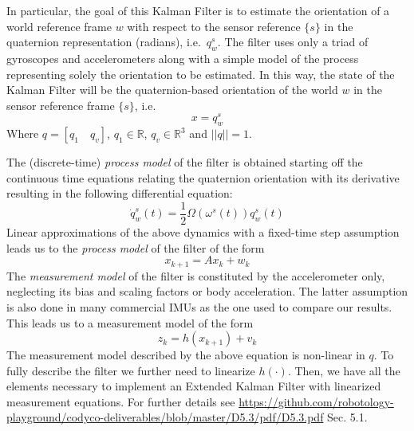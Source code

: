 In particular,
the goal of this Kalman Filter is to estimate the orientation of a world reference frame $w$ with respect to the sensor reference $\{s\}$ in the quaternion representation (radians), i.e.~$q^{s}_{w}$.  The filter uses only a triad of gyroscopes and accelerometers  along with a simple model of the process representing solely the orientation to be estimated. In this way, the state of the Kalman Filter will be the quaternion-based orientation of the world $w$ in the sensor reference frame $\{s\}$, i.e.
\begin{equation}
  x = q^{s}_{w}
\end{equation}
Where $q = [q_1 \quad q_v]$, $q_1 \in \mathbb{R}$, $q_v \in \mathbb{R}^3$ and $||q|| = 1$. 

The (discrete-time) \emph{process model} of the filter
 is obtained starting off the continuous time equations relating the quaternion orientation with its derivative resulting in the following differential equation:
 \begin{equation}
  \dot{q}^{s}_{w}(t) = \frac{1}{2}\Omega(\omega^{s}(t))q^{s}_{w}(t)
  \label{Eq:diffEq}
 \end{equation}
 Linear approximations of the above dynamics with a fixed-time step assumption leads us to the \emph{process model} of the filter of the form 
 \[x_{k+1} = Ax_k + w_k\]
The \emph{measurement model} of the filter is constituted by the accelerometer only, neglecting its bias and scaling factors or body acceleration. The latter assumption is also done in many commercial IMUs as the one used to compare our results. This leads us to a measurement model of the form
\[z_{k} = h(x_{k+1}) + v_{k}\]
 The measurement model described by the above equation is non-linear in $q$. To fully describe the filter we further need to linearize $h(\cdot)$. 
  Then, we have all the elements necessary to implement an Extended Kalman Filter with linearized measurement equations.
For further details see  \url{https://github.com/robotology-playground/codyco-deliverables/blob/master/D5.3/pdf/D5.3.pdf} Sec. 5.1.










